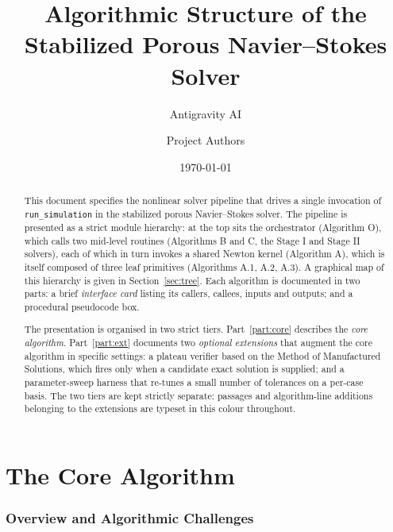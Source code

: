 \documentclass{article}
\title{Algorithmic Structure of the Stabilized Porous Navier--Stokes Solver}
\author{Antigravity AI \and Project Authors}
\date{\today}
\newcommand{\code}[1]{\texttt{\small #1}}
\newcommand{\extline}[1]{{\color{extcolor}#1}}
\begin{document}
\maketitle

\begin{abstract}
\sloppy
This document specifies the nonlinear solver pipeline that drives a
single invocation of \code{run\_simulation} in the stabilized porous
Navier--Stokes solver. The pipeline is presented as a strict module
hierarchy: at the top sits the orchestrator (Algorithm O), which calls
two mid-level routines (Algorithms B and C, the Stage I and Stage II
solvers), each of which in turn invokes a shared Newton kernel
(Algorithm A), which is itself composed of three leaf primitives
(Algorithms A.1, A.2, A.3). A graphical map of this hierarchy is given
in Section~\ref{sec:tree}. Each algorithm is documented in two parts:
a brief \emph{interface card} listing its callers, callees, inputs and
outputs; and a procedural pseudocode box.

The presentation is organised in two strict tiers. Part~\ref{part:core}
describes the \emph{core algorithm}. Part~\ref{part:ext} documents two
\emph{optional extensions} that augment the core algorithm in specific
settings: a plateau verifier based on the Method of Manufactured
Solutions, which fires only when a candidate exact solution is supplied;
and a parameter-sweep harness that re-tunes a small number of
tolerances on a per-case basis. The two tiers are kept strictly
separate: passages and algorithm-line additions belonging to the
extensions are typeset in \extline{this colour} throughout.
\end{abstract}

\tableofcontents

\part{The Core Algorithm}
\label{part:core}

\section{Overview and Algorithmic Challenges}
\label{sec:overview}
\end{document}
